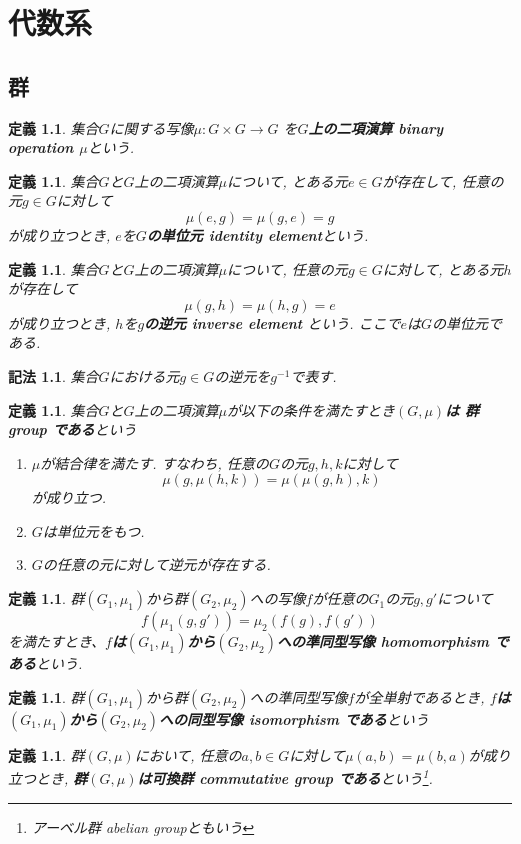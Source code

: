 \documentclass[dvipdfmx]{jsbook}
\theoremstyle{plain}
\newtheorem{Def}[thm]{定義}
\newtheorem{Notation}[thm]{記法}
\begin{document}
\chapter{代数系}
\section{群}
\begin{Def}
集合$G$に関する写像$\mu:G\times G\rightarrow G$
を{\bf $G$上の二項演算 binary operation $\mu$}という.
\end{Def}
\begin{Def}
集合$G$と$G$上の二項演算$\mu$について, とある元$e\in G$が存在して, 任意の元$g\in G$に対して\[\mu(e,g)=\mu(g,e)=g\]が成り立つとき, $e$を{\bf $G$の単位元 identity element}という.
\end{Def}
\begin{Def}
集合$G$と$G$上の二項演算$\mu$について, 任意の元$g\in G$に対して, とある元$h$が存在して \[\mu(g,h)=\mu(h,g)=e\]が成り立つとき, $h$を{\bf $g$の逆元 inverse element }という.
ここで$e$は$G$の単位元である.
\end{Def}
\begin{Notation}
集合$G$における元$g\in G$の逆元を$g^{-1}$で表す.
\end{Notation}
\begin{Def}
集合$G$と$G$上の二項演算$\mu$が以下の条件を満たすとき{\bf$(G,\mu)$は 群 group である}という
\begin{enumerate}
\item $\mu$が結合律を満たす. すなわち, 任意の$G$の元$g,h,k$に対して\[\mu(g,\mu(h,k))=\mu(\mu(g,h),k)\]が成り立つ.
\item $G$は単位元をもつ.
\item $G$の任意の元に対して逆元が存在する.
\end{enumerate}
\end{Def}
\begin{Def}
群$(G_1,\mu_1)$から群$(G_2,\mu_2)$への写像$f$が任意の$G_1$の元$g, g'$について \[f(\mu_1(g,g')) = \mu_2(f(g),f(g'))\] を満たすとき、{\bf $f$は$(G_1,\mu_1)$から$(G_2,\mu_2)$への準同型写像 homomorphism である}という.
\end{Def}
\begin{Def}
群$(G_1,\mu_1)$から群$(G_2,\mu_2)$への準同型写像$f$が全単射であるとき,
{\bf $f$は$(G_1,\mu_1)$から$(G_2,\mu_2)$への同型写像 isomorphism である}という
\end{Def}
\begin{Def}
群$(G,\mu)$において,
任意の$a,b\in G$に対して$\mu(a,b)=\mu(b,a)$が成り立つとき,
{\bf 群$(G,\mu)$は可換群 commutative group である}という\footnote{アーベル群 abelian groupともいう}.
\end{Def}
\begin{comment}
\begin{Def}
位相空間$X$と自然数$n$に対して次の手続きで決定されるアーベル群$H_n(X)$を{\bf$n$次 ホモロジー群}と呼ぶ

...

\end{Def}
\end{comment}
\end{document}
